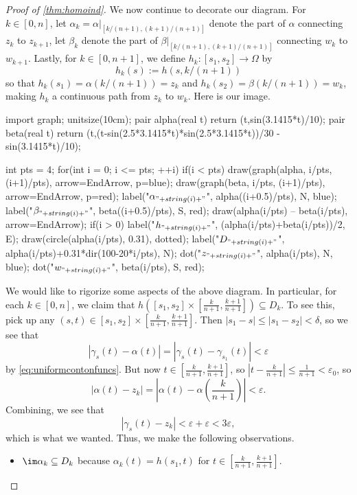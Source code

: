 \begin{proof}[Proof of \autoref{thm:homoind}]
	We now continue to decorate our diagram. For $k\in[0,n]$, let $\alpha_k=\alpha|_{[k/(n+1),(k+1)/(n+1)]}$ denote the part of $\alpha$ connecting $z_k$ to $z_{k+1}$, let $\beta_k$ denote the part of $\beta|_{[k/(n+1),(k+1)/(n+1)]}$ connecting $w_k$ to $w_{k+1}$. Lastly, for $k\in[0,n+1]$, we define $h_k:[s_1,s_2]\to\Omega$ by
	\[h_k(s):=h(s,k/(n+1))\]
	so that $h_k(s_1)=\alpha(k/(n+1))=z_k$ and $h_k(s_2)=\beta(k/(n+1))=w_k$, making $h_k$ a continuous path from $z_k$ to $w_k$. Here is our image.
	\begin{center}
		\begin{asy}
			import graph;
			unitsize(10cm);
			pair alpha(real t)
			{
				return (t,sin(3.1415*t)/10);
			}
			pair beta(real t)
			{
				return (t,(t-sin(2.5*3.1415*t)*sin(2.5*3.1415*t))/30 - sin(3.1415*t)/10);
			}

			int pts = 4;
			for(int i = 0; i <= pts; ++i)
			{
				if(i < pts)
				{
					draw(graph(alpha, i/pts, (i+1)/pts), arrow=EndArrow, p=blue);
					draw(graph(beta, i/pts, (i+1)/pts), arrow=EndArrow, p=red);
					label("$\alpha_{"+string(i)+"}$", alpha((i+0.5)/pts), N, blue);
					label("$\beta_{"+string(i)+"}$", beta((i+0.5)/pts), S, red);
					draw(alpha(i/pts) -- beta(i/pts), arrow=EndArrow);
					if(i > 0)
						label("$h_{"+string(i)+"}$", (alpha(i/pts)+beta(i/pts))/2, E);
					draw(circle(alpha(i/pts), 0.31), dotted);
					label("$D_{"+string(i)+"}$", alpha(i/pts)+0.31*dir(100-20*i/pts), N);
				}
				dot("$z_{"+string(i)+"}$", alpha(i/pts), N, blue);
				dot("$w_{"+string(i)+"}$", beta(i/pts), S, red);
			}
		\end{asy}
	\end{center}
	We would like to rigorize some aspects of the above diagram. In particular, for each $k\in[0,n]$, we claim that $h\left([s_1,s_2]\times\left[\frac k{n+1},\frac{k+1}{n+1}\right]\right)\subseteq D_k$. To see this, pick up any $(s,t)\in[s_1,s_2]\times\left[\frac k{n+1},\frac{k+1}{n+1}\right]$. Then $|s_1-s|\le|s_1-s_2|<\delta$, so we see that
	\[|\gamma_s(t)-\alpha(t)|=|\gamma_s(t)-\gamma_{s_1}(t)|<\varepsilon\]
	by \autoref{eq:uniformcontonfuncs}. But now $t\in\left[\frac k{n+1},\frac{k+1}{n+1}\right]$, so $\left|t-\frac k{n+1}\right|\le\frac1{n+1}<\varepsilon_0$, so
	\[|\alpha(t)-z_k|=\left|\alpha(t)-\alpha\left(\frac k{n+1}\right)\right|<\varepsilon.\]
	Combining, we see that
	\[|\gamma_s(t)-z_k|<\varepsilon+\varepsilon<3\varepsilon,\]
	which is what we wanted. Thus, we make the following observations.
	\begin{itemize}
		\item $\im\alpha_k\subseteq D_k$ because $\alpha_k(t)=h(s_1,t)$ for $t\in\left[\frac k{n+1},\frac{k+1}{n+1}\right]$.

\end{itemize}
\end{proof}
